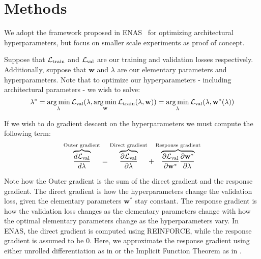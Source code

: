 \documentclass{article}
\DeclareMathOperator*{\argmin}{arg\,min}
\begin{document}
\newcommand{\hyper}{\lambda} %
\newcommand{\weight}{\textbf{w}} %
\newcommand{\hyperOpt}{\hyper^*} %
\newcommand{\weightOpt}{\weight^*} %
\newcommand{\lossValid}{\mathcal{L}_{\textnormal{val}}} %
\newcommand{\lossTrain}{\mathcal{L}_{\textnormal{train}}} %
\section{Methods}
We adopt the framework proposed in ENAS~\citep{pham2018efficient} for optimizing architectural hyperparameters, but focus on smaller scale experiments as proof of concept.

Suppose that $\lossTrain$ and $\lossValid$ are our training and validation losses respectively. 
Additionally, suppose that $\weight$ and $\hyper$ are our elementary parameters and hyperparameters.
Note that to optimize our hyperparameters - including architectural parameters - we wish to solve:
\begin{equation}
    \hyperOpt
    = \argmin_\hyper \lossValid ( \hyper, \argmin_\weight \lossTrain (\hyper, \weight) )
    = \argmin_\hyper \lossValid ( \hyper, \weightOpt (\hyper) )
\end{equation}

If we wish to do gradient descent on the hyperparameters we must compute the following term:
\begin{equation}
    \overbrace{\frac{d \lossValid}{d \hyper}}^{\textnormal{Outer gradient}} 
    = \overbrace{\frac{\partial \lossValid}{\partial \hyper}}^{\textnormal{Direct gradient}}
    + \overbrace{\frac{\partial \lossValid}{\partial \weightOpt} \frac{\partial \weightOpt}{\partial \hyper}}^{\textnormal{Response gradient}}
\end{equation}

Note how the Outer gradient is the sum of the direct gradient and the response gradient.
The direct gradient is how the hyperparameters change the validation loss, given the elementary parameters $\weightOpt$ stay constant.
The response gradient is how the validation loss changes as the elementary parameters change with how the optimal elementary parameters change as the hyperparameters vary.
In ENAS, the direct gradient is computed using REINFORCE, while the response gradient is assumed to be 0.
Here, we approximate the response gradient using either unrolled differentiation as in \citet{maclaurin2015gradient} or the Implicit Function Theorem as in \citet{pedregosa2016hyperparameter}.
\end{document}
